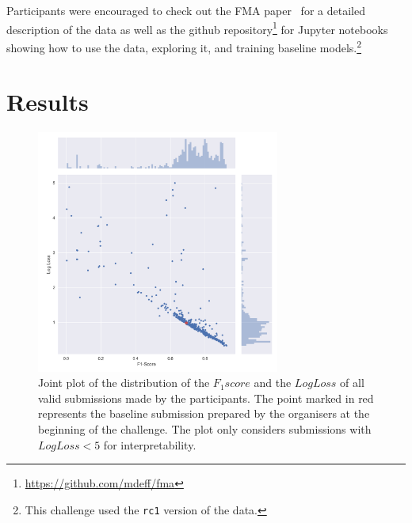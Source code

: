 \documentclass[sigconf]{acmart}
\begin{document}
Participants were encouraged to check out the FMA paper~\cite{fma_dataset} for a detailed description of the data as well as the github repository\footnote{\url{https://github.com/mdeff/fma}} for Jupyter notebooks showing how to use the data, exploring it, and training baseline models.\footnote{This challenge used the \texttt{rc1} version of the data.}

\section{Results}


\begin{figure}[h]
\label{fig:jointplot}
\includegraphics[width=8cm]{images/plot-1}
\centering
\caption{Joint plot of the distribution of the $F_1 score$  and the $Log Loss$ of all valid submissions made by the participants. The point marked in red represents the baseline submission prepared by the organisers at the beginning of the challenge. The plot only considers submissions with $Log Loss < 5 $ for interpretability. }
\end{figure}
\end{document}

